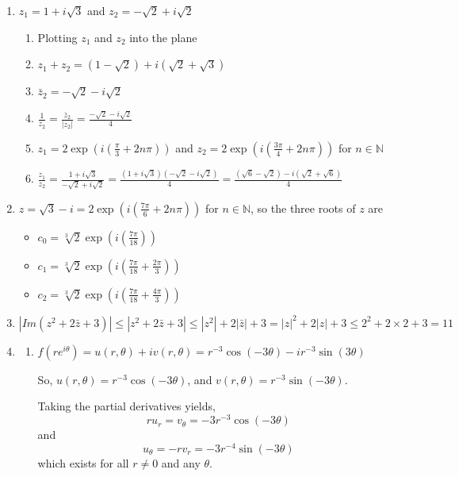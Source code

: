 \documentclass[12pt]{article}
\begin{document}
\begin{enumerate}
    \item $z_1 = 1 + i\sqrt3$ and $z_2 = -\sqrt2 + i\sqrt2$
    \begin{enumerate}
        \item Plotting $z_1$ and $z_2$ into the plane
        \item $z_1+z_2 = (1-\sqrt2) + i(\sqrt2 + \sqrt3)$
        \item $\bar z_2 = -\sqrt2 -i\sqrt2$
        \item $\frac{1}{z_2} = \frac{\bar z_2}{|z_2|} = \frac{-\sqrt2 - i\sqrt2}{4}$
        \item $z_1 = 2\exp(i(\frac{\pi}{3} + 2n\pi))$ and $z_2 = 2 \exp(i(\frac{3\pi}{4} + 2n\pi))$ for $n \in \mathbb{N}$
        \item $\frac{z_1}{z_2} = \frac{1+i\sqrt3}{-\sqrt2 + i\sqrt2} = \frac{(1+i\sqrt3)(-\sqrt2 - i\sqrt2)}{4} = \frac{( \sqrt6 - \sqrt2) -i(\sqrt2 + \sqrt6)}{4}$
    \end{enumerate}

    \item $z = \sqrt3 - i = 2\exp(i(\frac{7\pi}{6} + 2n\pi))$ for $n \in \mathbb{N}$, so the three roots of $z$ are
    \begin{itemize}
        \item $c_0 = \sqrt[3]2 \exp(i(\frac{7\pi}{18}))$
        \item $c_1 =  \sqrt[3]2 \exp(i(\frac{7\pi}{18} + \frac{2\pi}{3}))$
        \item $c_2 =  \sqrt[3]2 \exp(i(\frac{7\pi}{18} + \frac{4\pi}{3}))$
    \end{itemize}

    \item
    $|Im (z^2 + 2\bar z +3)| \le |z^2 + 2\bar z +3| \le |z^2| + 2|\bar z| + 3 = |z|^2 + 2|z| + 3 \le 2^2 + 2\times2 + 3 = 11$

    \item
    \begin{enumerate}
        \item $f(re^{i\theta}) = u(r, \theta) + iv(r, \theta) = r^{-3}\cos(-3\theta) - ir^{-3}\sin(3\theta)$

        So, $u(r, \theta)  = r^{-3}\cos(-3\theta)$, and $v(r, \theta) = r^{-3}\sin(-3\theta)$.

        Taking the partial derivatives yields, $$r u_r = v_\theta = -3r^{-3}\cos(-3\theta)$$ and $$u_\theta = -r v_r = -3r^{-4}\sin(-3\theta)$$ which exists for all $r \not = 0$ and any $\theta$.


\end{enumerate}
\end{enumerate}
\end{document}
